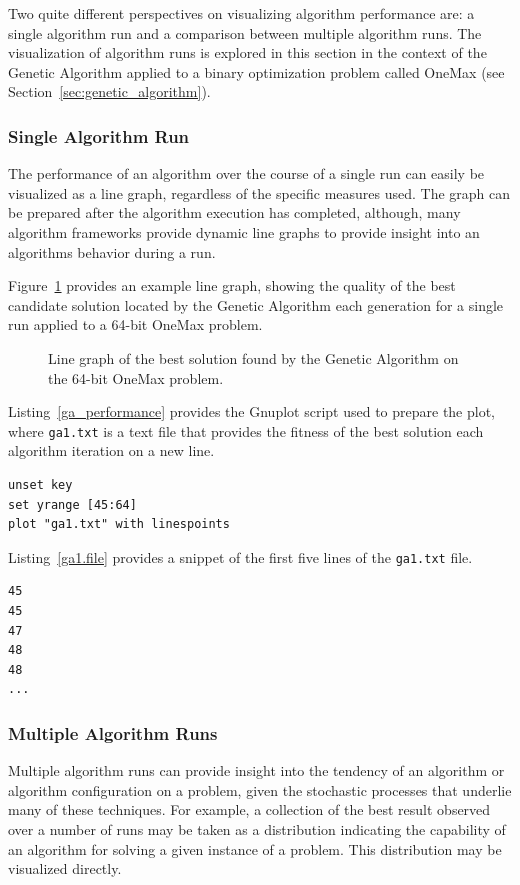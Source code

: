 Two quite different perspectives on visualizing algorithm performance are: a single algorithm run and a comparison between multiple algorithm runs. The visualization of algorithm runs is explored in this section in the context of the Genetic Algorithm applied to a binary optimization problem called OneMax (see Section~\ref{sec:genetic_algorithm}).

\subsubsection{Single Algorithm Run}
The performance of an algorithm over the course of a single run can easily be visualized as a line graph, regardless of the specific measures used. The graph can be prepared after the algorithm execution has completed, although, many algorithm frameworks provide dynamic line graphs to provide insight into an algorithms behavior during a run.

Figure~\ref{plot:ga1} provides an example line graph, showing the quality of the best candidate solution located by the Genetic Algorithm each generation for a single run applied to a 64-bit OneMax problem. 

\begin{figure}[htp]
\centering

\caption{Line graph of the best solution found by the Genetic Algorithm on the 64-bit OneMax problem.}
\label{plot:ga1}
\end{figure}

Listing~\ref{ga_performance} provides the Gnuplot script used to prepare the plot, where \texttt{ga1.txt} is a text file that provides the fitness of the best solution each algorithm iteration on a new line.

\begin{lstlisting}[caption=Gnuplot script for creating a line graph of algorithm performance over time., label=ga_performance]
unset key
set yrange [45:64]
plot "ga1.txt" with linespoints
\end{lstlisting}

Listing~\ref{ga1.file} provides a snippet of the first five lines of the \texttt{ga1.txt} file.

\begin{lstlisting}[caption=Snippet of the ga1.txt file., label=ga1.file]
45
45
47
48
48
...
\end{lstlisting}

\subsubsection{Multiple Algorithm Runs}
Multiple algorithm runs can provide insight into the tendency of an algorithm or algorithm configuration on a problem, given the stochastic processes that underlie many of these techniques. For example, a collection of the best result observed over a number of runs may be taken as a distribution indicating the capability of an algorithm for solving a given instance of a problem. This distribution may be visualized directly. 

